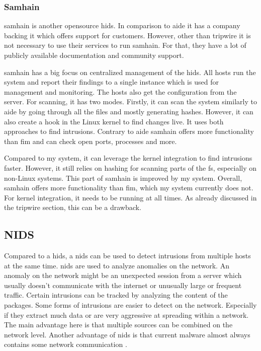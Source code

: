 \subsubsection{Samhain}
\label{sec:samhain}

\Gls{samhain} is another \gls{opensource} \gls{hids}. In comparison to \gls{aide} it has a company backing it which offers support for customers. However, other than \gls{tripwire} it is not necessary to use their services to run \gls{samhain}. For that, they have a lot of publicly available documentation and community support. \cite{samhain:company}

\Gls{samhain} has a big focus on centralized management of the \gls{hids}. All hosts run the system and report their findings to a single instance which is used for management and monitoring. The hosts also get the configuration from the server. For scanning, it has two modes. Firstly, it can scan the system similarly to \gls{aide} by going through all the files and mostly generating hashes. However, it can also create a hook in the Linux kernel to find changes live. It uses both approaches to find intrusions. Contrary to \gls{aide} \gls{samhain} offers more functionality than \gls{fim} and can check open ports, processes and more. 

Compared to my system, it can leverage the kernel integration to find intrusions faster. However, it still relies on hashing for scanning parts of the \gls{fs}, especially on non-Linux systems. This part of \gls{samhain} is improved by my system. Overall, \gls{samhain} offers more functionality than \gls{fim}, which my system currently does not. For kernel integration, it needs to be running at all times. As already discussed in the tripwire section, this can be a drawback.

\subsection{NIDS}
\label{sec:def:nids}

Compared to a \gls{hids}, a \gls{nids} can be used to detect intrusions from multiple hosts at the same time. \gls{nids} are used to analyze anomalies on the network. An \gls{anomaly} on the network might be an unexpected session from a server which usually doesn't communicate with the internet or unusually large or frequent traffic. Certain intrusions can be tracked by analyzing the content of the packages. Some forms of intrusions are easier to detect on the network. Especially if they extract much data or are very aggressive at spreading within a network. The main advantage here is that multiple sources can be combined on the network level. Another advantage of \gls{nids} is that current \gls{malware} almost always contains some network communication \cite{Malware:Behaviour,nids}.

